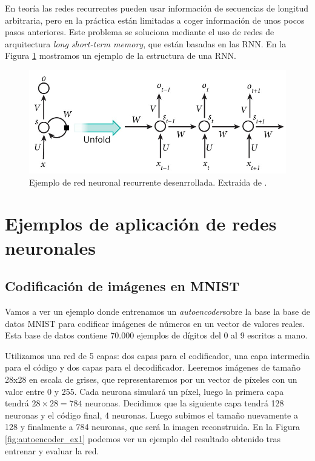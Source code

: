 \documentclass[
  a4paper,
  12pt,
  spanish,
]{scrartcl}
\theoremstyle{teorema-style}
\begin{document}
En teoría las redes recurrentes pueden usar información de secuencias de longitud arbitraria, pero en la práctica están limitadas a coger información de unos pocos pasos anteriores. Este problema se soluciona mediante el uso de redes de arquitectura \textit{long short-term memory}, que están basadas en las RNN. En la Figura \ref{fig:rnn} mostramos un ejemplo de la estructura de una RNN.

\begin{figure}[h]
    \centering
    \includegraphics[width=0.7\linewidth]{img/rnn.png}
    \caption{Ejemplo de red neuronal recurrente desenrrollada. Extraída de \parencite{nigam_understanding_2018}.}%
    \label{fig:rnn}
\end{figure}

\section{Ejemplos de aplicación de redes neuronales}
\label{sec:ejemplos}

\subsection{Codificación de imágenes en MNIST}

Vamos a ver un ejemplo donde entrenamos un \textit{autoencoder}\footnotemark sobre la base la base de datos MNIST \parencite{lecun_1998_gradient} para
codificar imágenes de números en un vector de valores reales. Esta base de datos contiene $70.000$ ejemplos de dígitos del 0 al 9 escritos a mano.


Utilizamos una red de 5 capas: dos capas para el codificador, una capa intermedia para el código y dos capas para el decodificador. Leeremos imágenes de tamaño 28x28 en escala de grises, que representaremos por un vector de píxeles con un valor entre 0 y 255. Cada neurona simulará un píxel, luego la primera capa tendrá $28 \times 28=784$ neuronas. Decidimos que la siguiente capa tendrá 128 neuronas y el código final, 4 neuronas. Luego subimos el tamaño nuevamente a 128 y finalmente a 784 neuronas, que será la imagen reconstruida. En la Figura \ref{fig:autoencoder_ex1} podemos ver un ejemplo del resultado obtenido tras entrenar y evaluar la red.
\end{document}
